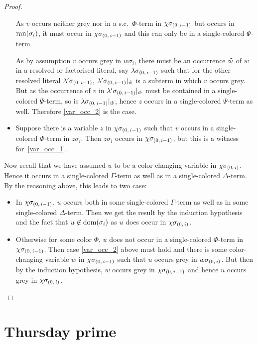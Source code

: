 \documentclass[,%
	draft=false,%
	numbers=noendperiod
	12pt,
	a4paper,
	oneside,%
	openany,
]{memoir}
\newcommand{\inv}{\ensuremath{\chi}}
\begin{document}
\begin{proof}
\begin{itemize}
			As $v$ occurs neither grey nor in a s.c.\ $\Phi$-term in $\inv\sigmazmi$ but occurs in $\operatorname{ran}(\sigma_i)$, it must occur in $\inv\sigmazmi$ and this can only be in a single-colored $\Psi$-term.

			As by assumption $v$ occurs grey in $w\sigma_i$, there must be an occurrence $\bm\hat w$ of $w$ in a resolved or factorised literal, say $\lambda\sigma_{(0,\,i-1)}$ such that for the other resolved literal $\lambda'\sigma_{(0,\,i-1)}$, $\lambda'\sigma_{(0,\,i-1)}|_{\bm\hat w}$ is a subterm in which $v$ occurs grey.
			But as the occurrence of $v$ in $\lambda'\sigma_{(0,\,i-1)}|_{\bm\hat w}$ must be contained in a single-colored $\Psi$-term, so is $\lambda\sigma_{(0,\,i-1)}|_{\bm\hat w}$, hence $z$ occurs in a single-colored $\Psi$-term as well.
			Therefore \ref{var_occ_2} is the case.

		\item
			Suppose there is a variable $z$ in $\inv\sigmazmi$ such that $v$ occurs in a single-colored $\Phi$-term in $z\sigma_i$.
			Then $z\sigma_i$ occurs in $\inv\sigmazmi$, but this is a witness for~\ref{var_occ_1}.
	\end{itemize}

	Now recall that we have assumed $u$ to be a color-changing variable in $\inv\sigmazi$.
	Hence it occurs in a single-colored $\Gamma$-term as well as in a single-colored $\Delta$-term.
	By the reasoning above, this leads to two case:
	\begin{itemize}
		\item In $\inv\sigmazmi$, $u$ occurs both in some single-colored $\Gamma$-term as well as in some single-colored $\Delta$-term.
			Then we get the result by the induction hypothesis and the fact that $u\not\in\operatorname{dom}(\sigma_i)$ as $u$ does occur in $\inv\sigmazi$.
		\item Otherwise for some color $\Phi$, $u$ does not occur in a single-colored $\Phi$-term in $\inv\sigmazmi$.
			Then case \ref{var_occ_2} above must hold and there is some color-changing variable $w$ in $\inv\sigmazmi$ such that $u$ occurs grey in $w\sigma_{(0,\,i)}$.
			But then by the induction hypothesis, $w$ occurs grey in $\inv\sigmazmi$ and hence $u$ occurs grey in $\inv\sigmazi$.
			\qedhere
	\end{itemize}
\end{proof}

\clearpage


\section{Thursday prime}
\end{document}
